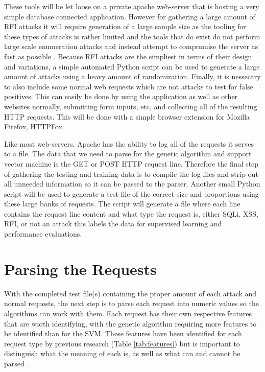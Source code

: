 These tools will be let loose on a private apache web-server that is hosting a very simple database connected application.  However for gathering a large amount of RFI attacks it will require generation of a large sample size as the tooling for these types of attacks is rather limited and the tools that do exist do not perform large scale enumeration attacks and instead attempt to compromise the server as fast as possible \cite{fimap}.  Because RFI attacks are the simpliest in terms of their design and variations, a simple automated Python script can be used to generate a large amount of attacks using a heavy amount of randomization.  Finally, it is nessecary to also include some normal web requests which are not attacks to test for false positives.  This can easily be done by using the application as well as other websites normally, submitting form inputs, etc, and collecting all of the resulting HTTP requests.  This will be done with a simple browser extension for Mozilla Firefox, HTTPFox.

Like most web-servers, Apache has the ability to log all of the requests it serves to a file.  The data that we need to parse for the genetic algorithm and support vector machine is the GET or POST HTTP request line. Therefore the final step of gathering the testing and training data is to compile the log files and strip out all unneeded information so it can be passed to the parser.  Another small Python script will be used to generate a test file of the correct size and proportions using these large banks of requests.  The script will generate a file where each line contains the request line content and what type the request is, either SQLi, XSS, RFI, or not an attack this labels the data for supervised learning and performance evaluations.

\section{Parsing the Requests} \label{sec:methodsParser}

With the completed test file(s) containing the proper amount of each attack and normal requests, the next step is to parse each request into numeric values so the algorithms can work with them.  Each request has their own respective features that are worth identifying, with the genetic algorithm requiring more features to be identified than for the SVM.  These features have been identified for each request type by previous research (Table \ref{tab:features}) but is important to distinguish what the meaning of each is, as well as what can and cannot be parsed \cite{mainPaper}.


